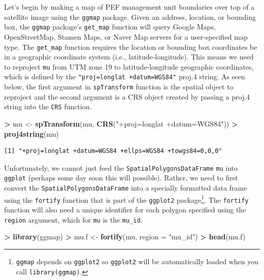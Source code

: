 \documentclass[]{krantz}
\makeatletter
\newenvironment{Shaded}{\begin{snugshade}}{\end{snugshade}}
\newcommand{\DataTypeTok}[1]{\textcolor[rgb]{0.27,0.27,0.27}{#1}}
\newcommand{\KeywordTok}[1]{\textcolor[rgb]{0.27,0.27,0.27}{\textbf{#1}}}
\newcommand{\NormalTok}[1]{#1}
\newcommand{\OperatorTok}[1]{\textcolor[rgb]{0.43,0.43,0.43}{\textbf{#1}}}
\newcommand{\StringTok}[1]{\textcolor[rgb]{0.5,0.5,0.5}{#1}}
\newenvironment{kframe}{%
\medskip{}
\setlength{\fboxsep}{.8em}
 \def\at@end@of@kframe{}%
 \ifinner\ifhmode%
  \def\at@end@of@kframe{\end{minipage}}%
  \begin{minipage}{\columnwidth}%
 \fi\fi%
 \def\FrameCommand##1{\hskip\@totalleftmargin \hskip-\fboxsep
 \colorbox{shadecolor}{##1}\hskip-\fboxsep
     \hskip-\linewidth \hskip-\@totalleftmargin \hskip\columnwidth}%
 \MakeFramed {\advance\hsize-\width
   \@totalleftmargin\z@ \linewidth\hsize
   \@setminipage}}%
 {\par\unskip\endMakeFramed%
 \at@end@of@kframe}
\renewenvironment{Shaded}{\begin{kframe}}{\end{kframe}}
\makeatother
\begin{document}
Let's begin by making a map of PEF management unit boundaries over top of a satellite image using the \texttt{ggmap} package. Given an address, location, or bounding box, the \texttt{ggmap} package's \texttt{get\_map} function will query Google Maps, OpenStreetMap, Stamen Maps, or Naver Map servers for a user-specified map type. The \texttt{get\_map} function requires the location or bounding box coordinates be in a geographic coordinate system (i.e., latitude-longitude). This means we need to reproject \texttt{mu} from UTM zone 19 to latitude-longitude geographic coordinates, which is defined by the \texttt{\textquotesingle{}"proj=longlat\ +datum=WGS84"\textquotesingle{}} proj.4 string. As seen below, the first argument in \texttt{spTransform} function is the spatial object to reproject and the second argument is a CRS object created by passing a proj.4 string into the \texttt{CRS} function.

\begin{Shaded}
\begin{Highlighting}[]
\OperatorTok{>}\StringTok{ }\NormalTok{mu <-}\StringTok{ }\KeywordTok{spTransform}\NormalTok{(mu, }\KeywordTok{CRS}\NormalTok{(}\StringTok{"+proj=longlat +datum=WGS84"}\NormalTok{))}
\OperatorTok{>}\StringTok{ }\KeywordTok{proj4string}\NormalTok{(mu)}
\end{Highlighting}
\end{Shaded}

\begin{verbatim}
[1] "+proj=longlat +datum=WGS84 +ellps=WGS84 +towgs84=0,0,0"
\end{verbatim}

Unfortunately, we cannot just feed the \texttt{SpatialPolygonsDataFrame} \texttt{mu} into \texttt{ggplot} (perhaps some day soon this will possible). Rather, we need to first convert the \texttt{SpatialPolygonsDataFrame} into a specially formatted data frame using the \texttt{fortify} function that is part of the \texttt{ggplot2} package\footnote{\texttt{ggmap} depends on \texttt{ggplot2} so \texttt{ggplot2} will be automatically loaded when you call \texttt{library(ggmap)}.}. The \texttt{fortify} function will also need a unique identifier for each polygon specified using the \texttt{region} argument, which for \texttt{mu} is the \texttt{mu\_id}.

\begin{Shaded}
\begin{Highlighting}[]
\OperatorTok{>}\StringTok{ }\KeywordTok{library}\NormalTok{(ggmap)}
\OperatorTok{>}\StringTok{ }\NormalTok{mu.f <-}\StringTok{ }\KeywordTok{fortify}\NormalTok{(mu, }\DataTypeTok{region =} \StringTok{"mu_id"}\NormalTok{)}
\OperatorTok{>}\StringTok{ }\KeywordTok{head}\NormalTok{(mu.f)}
\end{Highlighting}
\end{Shaded}
\end{document}
